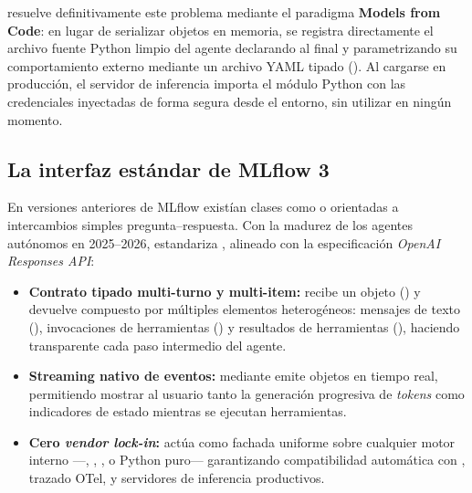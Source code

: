  resuelve definitivamente este problema mediante el paradigma \textbf{Models from Code}: en lugar de serializar objetos en memoria, se registra directamente el archivo fuente Python limpio del agente declarando al final  y parametrizando su comportamiento externo mediante un archivo YAML tipado (). Al cargarse en producción, el servidor de inferencia importa el módulo Python con las credenciales inyectadas de forma segura desde el entorno, sin utilizar  en ningún momento.

\subsection{La interfaz estándar \texorpdfstring{}{ResponsesAgent} de MLflow 3}\label{subsec:responses-agent}

\begin{modernbox}
En versiones anteriores de MLflow existían clases como  o  orientadas a intercambios simples pregunta--respuesta. Con la madurez de los agentes autónomos en 2025--2026,  estandariza , alineado con la especificación \textit{OpenAI Responses API}:
\begin{itemize}
  \item \textbf{Contrato tipado multi-turno y multi-item:} recibe un objeto  () y devuelve  compuesto por múltiples elementos heterogéneos: mensajes de texto (), invocaciones de herramientas () y resultados de herramientas (), haciendo transparente cada paso intermedio del agente.
  \item \textbf{Streaming nativo de eventos:} mediante  emite objetos  en tiempo real, permitiendo mostrar al usuario tanto la generación progresiva de \textit{tokens} como indicadores de estado mientras se ejecutan herramientas.
  \item \textbf{Cero \textit{vendor lock-in}:} actúa como fachada uniforme sobre cualquier motor interno ---, , ,  o Python puro--- garantizando compatibilidad automática con , trazado OTel,  y servidores de inferencia productivos.
\end{itemize}
\end{modernbox}

